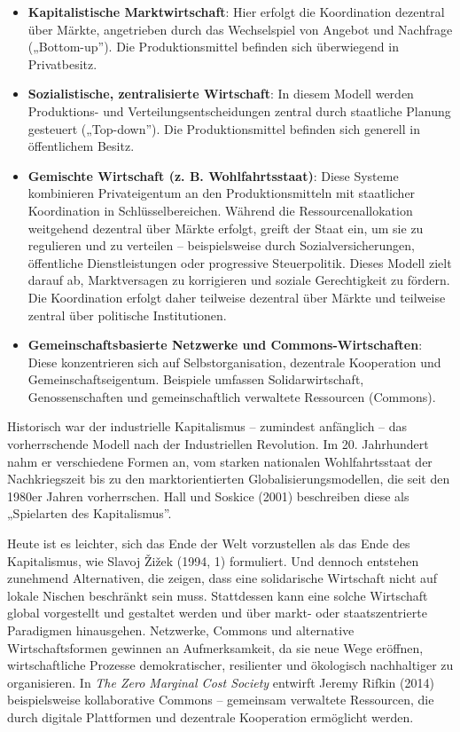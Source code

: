 \documentclass[
  nswissgerman,
  a4paper,
  openany]{book}
\begin{document}
\begin{itemize}
\item
  \textbf{Kapitalistische Marktwirtschaft}: Hier erfolgt die
  Koordination dezentral über Märkte, angetrieben durch das Wechselspiel
  von Angebot und Nachfrage („Bottom-up''). Die Produktionsmittel
  befinden sich überwiegend in Privatbesitz.
\item
  \textbf{Sozialistische, zentralisierte Wirtschaft}: In diesem Modell
  werden Produktions- und Verteilungsentscheidungen zentral durch
  staatliche Planung gesteuert („Top-down''). Die Produktionsmittel
  befinden sich generell in öffentlichem Besitz.
\item
  \textbf{Gemischte Wirtschaft (z. B. Wohlfahrtsstaat)}: Diese Systeme
  kombinieren Privateigentum an den Produktionsmitteln mit staatlicher
  Koordination in Schlüsselbereichen. Während die Ressourcenallokation
  weitgehend dezentral über Märkte erfolgt, greift der Staat ein, um sie
  zu regulieren und zu verteilen -- beispielsweise durch
  Sozialversicherungen, öffentliche Dienstleistungen oder progressive
  Steuerpolitik. Dieses Modell zielt darauf ab, Marktversagen zu
  korrigieren und soziale Gerechtigkeit zu fördern. Die Koordination
  erfolgt daher teilweise dezentral über Märkte und teilweise zentral
  über politische Institutionen.
\item
  \textbf{Gemeinschaftsbasierte Netzwerke und Commons-Wirtschaften}:
  Diese konzentrieren sich auf Selbstorganisation, dezentrale
  Kooperation und Gemeinschaftseigentum. Beispiele umfassen
  Solidarwirtschaft, Genossenschaften und gemeinschaftlich verwaltete
  Ressourcen (Commons).
\end{itemize}

Historisch war der industrielle Kapitalismus -- zumindest anfänglich --
das vorherrschende Modell nach der Industriellen Revolution. Im 20.
Jahrhundert nahm er verschiedene Formen an, vom starken nationalen
Wohlfahrtsstaat der Nachkriegszeit bis zu den marktorientierten
Globalisierungsmodellen, die seit den 1980er Jahren vorherrschen. Hall
und Soskice (2001) beschreiben diese als „Spielarten des Kapitalismus''.

Heute ist es leichter, sich das Ende der Welt vorzustellen als das Ende
des Kapitalismus, wie Slavoj Žižek (1994, 1) formuliert. Und dennoch
entstehen zunehmend Alternativen, die zeigen, dass eine solidarische
Wirtschaft nicht auf lokale Nischen beschränkt sein muss. Stattdessen
kann eine solche Wirtschaft global vorgestellt und gestaltet werden und
über markt- oder staatszentrierte Paradigmen hinausgehen. Netzwerke,
Commons und alternative Wirtschaftsformen gewinnen an Aufmerksamkeit, da
sie neue Wege eröffnen, wirtschaftliche Prozesse demokratischer,
resilienter und ökologisch nachhaltiger zu organisieren. In \emph{The
Zero Marginal Cost Society} entwirft Jeremy Rifkin (2014) beispielsweise
kollaborative Commons -- gemeinsam verwaltete Ressourcen, die durch
digitale Plattformen und dezentrale Kooperation ermöglicht werden.
\end{document}
